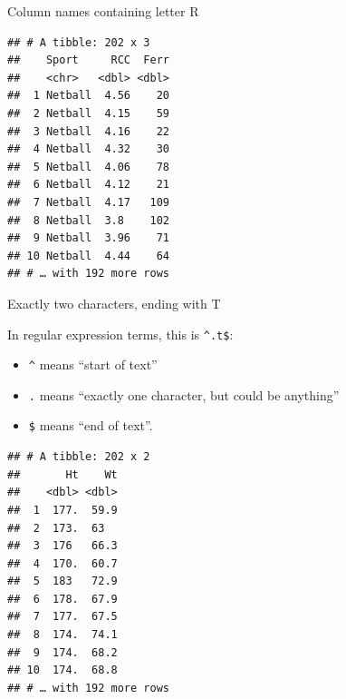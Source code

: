 \documentclass[ignorenonframetext,]{beamer}
\newenvironment{Shaded}{\begin{snugshade}}{\end{snugshade}}
\newcommand{\KeywordTok}[1]{\textcolor[rgb]{0.13,0.29,0.53}{\textbf{#1}}}
\newcommand{\NormalTok}[1]{#1}
\newcommand{\OperatorTok}[1]{\textcolor[rgb]{0.81,0.36,0.00}{\textbf{#1}}}
\newcommand{\StringTok}[1]{\textcolor[rgb]{0.31,0.60,0.02}{#1}}
\providecommand{\tightlist}{%
  \setlength{\itemsep}{0pt}\setlength{\parskip}{0pt}}
\begin{document}
\begin{frame}[fragile]{Column names containing letter R}
\protect\hypertarget{column-names-containing-letter-r}{}

\begin{Shaded}
\end{Shaded}

\begin{verbatim}
## # A tibble: 202 x 3
##    Sport     RCC  Ferr
##    <chr>   <dbl> <dbl>
##  1 Netball  4.56    20
##  2 Netball  4.15    59
##  3 Netball  4.16    22
##  4 Netball  4.32    30
##  5 Netball  4.06    78
##  6 Netball  4.12    21
##  7 Netball  4.17   109
##  8 Netball  3.8    102
##  9 Netball  3.96    71
## 10 Netball  4.44    64
## # … with 192 more rows
\end{verbatim}

\end{frame}

\begin{frame}[fragile]{Exactly two characters, ending with T}
\protect\hypertarget{exactly-two-characters-ending-with-t}{}

In regular expression terms, this is \texttt{\^{}.t\$}:

\begin{itemize}
\tightlist
\item
  \texttt{\^{}} means ``start of text''
\item
  \texttt{.} means ``exactly one character, but could be anything''
\item
  \texttt{\$} means ``end of text''.
\end{itemize}

\begin{Shaded}
\end{Shaded}

\begin{verbatim}
## # A tibble: 202 x 2
##       Ht    Wt
##    <dbl> <dbl>
##  1  177.  59.9
##  2  173.  63  
##  3  176   66.3
##  4  170.  60.7
##  5  183   72.9
##  6  178.  67.9
##  7  177.  67.5
##  8  174.  74.1
##  9  174.  68.2
## 10  174.  68.8
## # … with 192 more rows
\end{verbatim}

\end{frame}
\end{document}
